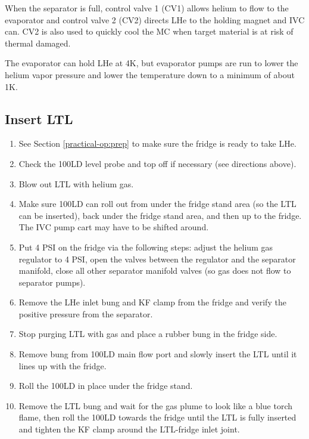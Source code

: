 When the separator is full, control valve 1 (CV1) allows helium to flow to the evaporator and control valve 2 (CV2) directs LHe to the holding magnet and IVC can.  CV2 is also used to quickly cool the MC when target material is at risk of thermal damaged.

The evaporator can hold LHe at 4K, but evaporator pumps are run to lower the helium vapor pressure and lower the temperature down to a minimum of about 1K.

\subsection{Insert LTL}
\begin{enumerate}
 \item See Section \ref{practical-op:prep} to make sure the fridge is ready to take LHe.
 \item Check the 100LD level probe and top off if necessary (see directions above).
 \item Blow out LTL with helium gas.
 \item Make sure 100LD can roll out from under the fridge stand area (so the LTL can be inserted), back under the fridge stand area, and then up to the fridge.  The IVC pump cart may have to be shifted around.
 \item Put 4 PSI on the fridge via the following steps: adjust the helium gas regulator to 4 PSI, open the valves between the regulator and the separator manifold, close all other separator manifold valves (so gas does not flow to separator pumps).
 \item Remove the LHe inlet bung and KF clamp from the fridge and verify the positive pressure from the separator.
 \item Stop purging LTL with gas and place a rubber bung in the fridge side.
 \item Remove bung from 100LD main flow port and slowly insert the LTL until it lines up with the fridge.
 \item Roll the 100LD in place under the fridge stand.
 \item Remove the LTL bung and wait for the gas plume to look like a blue torch flame, then roll the 100LD towards the fridge until the LTL is fully inserted and tighten the KF clamp around the LTL-fridge inlet joint.
 \end{enumerate}
 
